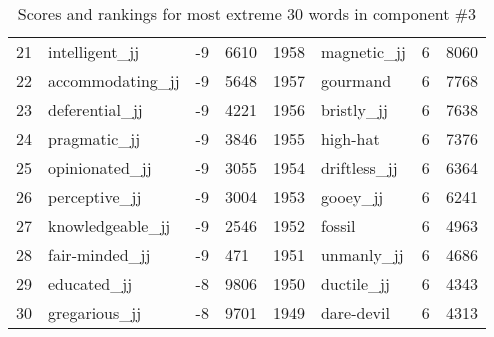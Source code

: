 \begin{table}[tbp]
\begin{tabular}{| rlr@{.}l | rlr@{.}l |}
    21 & intelligent\_jj & -9 & 6610    &    1958 & magnetic\_jj & 6 & 8060 \\
    22 & accommodating\_jj & -9 & 5648    &    1957 & gourmand & 6 & 7768 \\
    23 & deferential\_jj & -9 & 4221    &    1956 & bristly\_jj & 6 & 7638 \\
    24 & pragmatic\_jj & -9 & 3846    &    1955 & high-hat & 6 & 7376 \\
    25 & opinionated\_jj & -9 & 3055    &    1954 & driftless\_jj & 6 & 6364 \\
    26 & perceptive\_jj & -9 & 3004    &    1953 & gooey\_jj & 6 & 6241 \\
    27 & knowledgeable\_jj & -9 & 2546    &    1952 & fossil & 6 & 4963 \\
    28 & fair-minded\_jj & -9 & 471    &    1951 & unmanly\_jj & 6 & 4686 \\
    29 & educated\_jj & -8 & 9806    &    1950 & ductile\_jj & 6 & 4343 \\
    30 & gregarious\_jj & -8 & 9701    &    1949 & dare-devil & 6 & 4313 \\
    \hline
    \end{tabular}
    \caption{Scores and rankings for most extreme 30 words in component \#3} 
\end{table}
\clearpage
